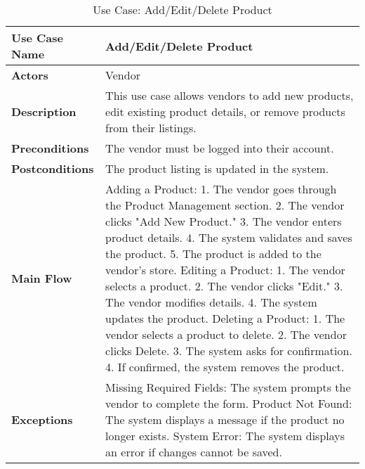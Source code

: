 \begin{table}[h]
\centering
\begin{tabular}{|p{3cm}|p{10cm}|}
\hline
\textbf{Use Case Name} & Add/Edit/Delete Product \\
\hline
\textbf{Actors} & Vendor \\
\hline
\textbf{Description} & This use case allows vendors to add new products, edit existing product details, or remove products from their listings. \\
\hline
\textbf{Preconditions} & The vendor must be logged into their account. \\
\hline
\textbf{Postconditions} & The product listing is updated in the system. \\
\hline
\textbf{Main Flow} & Adding a Product: 1. The vendor goes through the Product Management section. 2. The vendor clicks "Add New Product." 3. The vendor enters product details. 4. The system validates and saves the product. 5. The product is added to the vendor's store. Editing a Product: 1. The vendor selects a product. 2. The vendor clicks "Edit." 3. The vendor modifies details. 4. The system updates the product. Deleting a Product: 1. The vendor selects a product to delete. 2. The vendor clicks Delete. 3. The system asks for confirmation. 4. If confirmed, the system removes the product. \\
\hline
\textbf{Exceptions} & Missing Required Fields: The system prompts the vendor to complete the form. Product Not Found: The system displays a message if the product no longer exists. System Error: The system displays an error if changes cannot be saved. \\
\hline
\end{tabular}
\caption{Use Case: Add/Edit/Delete Product}
\end{table}

